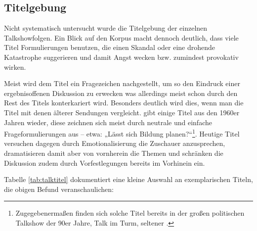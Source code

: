 \subsection{Titelgebung}\label{chap:titelgebung}

Nicht systematisch untersucht wurde die Titelgebung der einzelnen Talkshowfolgen. Ein Blick auf den Korpus macht dennoch deutlich, dass viele Titel Formulierungen benutzen, die einen Skandal oder eine drohende Katastrophe suggerieren und damit Angst wecken bzw. zumindest provokativ wirken.

Meist wird dem Titel ein Fragezeichen nachgestellt, um so den Eindruck einer ergebnisoffenen Diskussion zu erwecken was allerdings meist schon durch den Rest des Titels konterkariert wird. Besonders deutlich wird dies, wenn man die Titel mit denen älterer Sendungen vergleicht. \textcite[195f.]{kellerGeschichteTalkshowDeutschland2009} gibt einige Titel aus den 1960er Jahren wieder, diese zeichnen sich meist durch neutrale und einfache Frageformulierungen aus – etwa: „Lässt sich Bildung planen?“\footnote{Zugegebenermaßen finden sich solche Titel bereits in der großen politischen Talkshow der 90er Jahre, Talk im Turm, seltener \parencite[301f.]{kellerGeschichteTalkshowDeutschland2009}.}. Heutige Titel versuchen dagegen durch Emotionalisierung die Zuschauer anzusprechen, dramatisieren damit aber von vornherein die Themen und schränken die Diskussion zudem durch Vorfestlegungen bereits im Vorhinein ein.

Tabelle \vref{tab:talktitel} dokumentiert eine kleine Auswahl an exemplarischen Titeln, die obigen Befund veranschaulichen:

\begin{table}[ht]
	\centering
	\caption{Ausgewählte Titelbeispiele}
\label{tab:talktitel}
\end{table}


